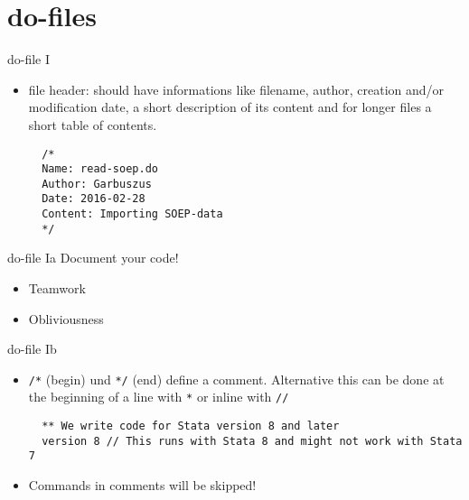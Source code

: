 \section{do-files}
\begin{frame}[fragile]{do-file I}
  \begin{itemize}
  \item file header: should have informations like filename, author, creation and/or modification date, a short description of its content and for longer files a short table of contents.
    
  \begin{lstlisting}
  /*
  Name: read-soep.do
  Author: Garbuszus
  Date: 2016-02-28
  Content: Importing SOEP-data
  */
  \end{lstlisting}
  \end{itemize}
\end{frame}

\begin{frame}{do-file Ia}
Document your code! 
\begin{itemize}
\item Teamwork
\item Obliviousness 
\end{itemize}

  

\end{frame}


\begin{frame}[fragile]{do-file Ib}
\begin{itemize} 
   \item \texttt{/*} (begin) und \texttt{*/} (end) define a comment. Alternative this can be done at the beginning of a line with \texttt{*} or inline with \texttt{//}
  
  \begin{lstlisting}
  ** We write code for Stata version 8 and later
  version 8 // This runs with Stata 8 and might not work with Stata 7
  \end{lstlisting}
  \item Commands in comments will be skipped!
  \end{itemize}
\end{frame}

